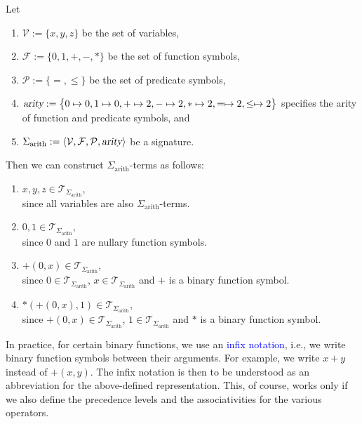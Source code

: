 \exampleEng
Let
\begin{enumerate}
\item $\mathcal{V} := \{ x, y, z \}$ be the set of variables,
\item $\mathcal{F} := \{ 0, 1, \mathtt{+}, \mathtt{-}, * \}$ be the set of function symbols,
\item $\mathcal{P} := \{\mathtt{=}, \leq\}$ be the set of predicate symbols,
\item $\textsl{arity} := \bigl\{ 0 \mapsto 0, 1 \mapsto 0, \mathtt{+} \mapsto 2, \mathtt{-} \mapsto 2,
                                 * \mapsto 2, = \mapsto 2, \leq \mapsto 2 \bigr\}$
      specifies the arity of function and predicate symbols, and
\item $\Sigma_\mathrm{arith} := \langle \mathcal{V}, \mathcal{F}, \mathcal{P}, \textsl{arity} \rangle$
      be a signature.
\end{enumerate}
Then we can construct $\Sigma_{\mathrm{arith}}$-terms as follows:
\begin{enumerate}
\item $x, y, z \in \mathcal{T}_{\Sigma_{\mathrm{arith}}}$, \\[0.2cm]
      since all variables are also $\Sigma_{\mathrm{arith}}$-terms.
\item $0, 1 \in \mathcal{T}_{\Sigma_{\mathrm{arith}}}$,  \\[0.2cm]
      since $0$ and $1$ are nullary function symbols.
\item $\mathtt{+}(0,x) \in \mathcal{T}_{\Sigma_{\mathrm{arith}}}$, \\[0.2cm]
      since $0 \in \mathcal{T}_{\Sigma_{\mathrm{arith}}}$, $x \in \mathcal{T}_{\Sigma_{\mathrm{arith}}}$ and 
      $\mathtt{+}$ is a binary function symbol.
\item $*(\mathtt{+}(0,x),1) \in \mathcal{T}_{\Sigma_{\mathrm{arith}}}$, \\[0.2cm]
      since $\mathtt{+}(0,x) \in \mathcal{T}_{\Sigma_{\mathrm{arith}}}$, $1 \in \mathcal{T}_{\Sigma_{\mathrm{arith}}}$ and
      $*$ is a binary function symbol.
\end{enumerate}
In practice, for certain binary functions, we use an \textcolor{blue}{infix notation},
i.e., we write binary function symbols between their arguments. For example,
we write $x+y$ instead of $+(x,y)$. The infix notation is then to be understood as an abbreviation for the
above-defined representation. This, of course, works only if we also define the precedence levels and the
associativities for the various operators. 
\eox

